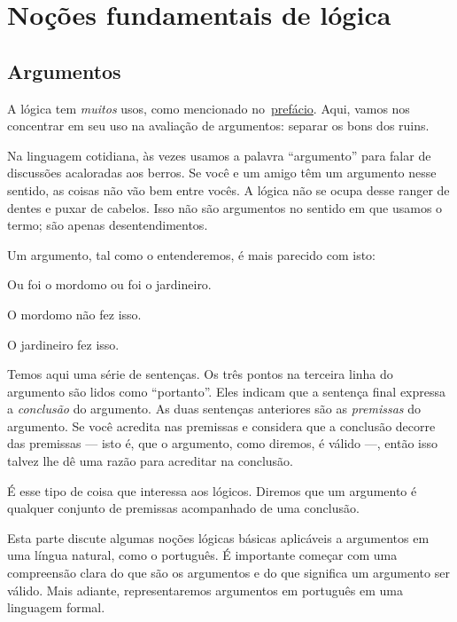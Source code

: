 \part{Noções fundamentais de lógica}
\label{ch.intro}


\chapter{Argumentos}
\label{s:Arguments}

A lógica tem \emph{muitos} usos, como mencionado no~\hyperref[preface]{prefácio}. Aqui, vamos nos concentrar em seu uso na avaliação de argumentos: separar os bons dos ruins.

Na linguagem cotidiana, às vezes usamos a palavra \textquotedblleft argumento\textquotedblright{} para falar de discussões acaloradas aos berros. Se você e um amigo têm um argumento nesse sentido, as coisas não vão bem entre vocês. A lógica não se ocupa desse ranger de dentes e puxar de cabelos. Isso não são argumentos no sentido em que usamos o termo; são apenas desentendimentos.

Um argumento, tal como o entenderemos, é mais parecido com isto:
	\begin{earg}\label{argButlerGardner}
		\item Ou foi o mordomo ou foi o jardineiro.
		\item O mordomo não fez isso.
		\item[\texttherefore] O jardineiro fez isso.
	\end{earg}
Temos aqui uma série de sentenças. Os três pontos na terceira linha do argumento são lidos como \textquotedblleft portanto\textquotedblright{}. Eles indicam que a sentença final expressa a \emph{conclusão} do argumento. As duas sentenças anteriores são as \emph{premissas} do argumento. Se você acredita nas premissas e considera que a conclusão decorre das premissas — isto é, que o argumento, como diremos, é válido —, então isso talvez lhe dê uma razão para acreditar na conclusão.

É esse tipo de coisa que interessa aos lógicos. Diremos que um argumento é qualquer conjunto de premissas acompanhado de uma conclusão.

Esta parte discute algumas noções lógicas básicas aplicáveis a argumentos em uma língua natural, como o português. É importante começar com uma compreensão clara do que são os argumentos e do que significa um argumento ser válido. Mais adiante, representaremos argumentos em português em uma linguagem formal. %

